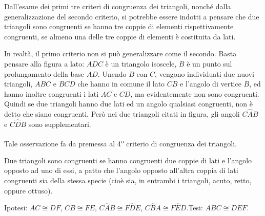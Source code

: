 \osservazione Dall'esame dei primi tre criteri di congruenza dei triangoli, nonché dalla generalizzazione del secondo criterio, si potrebbe essere indotti a pensare che due triangoli sono congruenti se hanno tre coppie di elementi rispettivamente congruenti, se almeno una delle tre coppie di elementi è costituita da lati.

\noindent \begin{minipage}{0.6\textwidth}
In realtà, il primo criterio non si può generalizzare come il secondo. Basta pensare alla figura a lato: $ADC$ è un triangolo isoscele, $B$ è un punto sul prolungamento della base $AD$. Unendo $B$ con $C$, vengono individuati due nuovi triangoli, $ABC$ e $BCD$ che hanno in comune il lato $CB$ e l'angolo di vertice $B$, ed hanno inoltre congruenti i lati $AC$ e $CD$, ma evidentemente non sono congruenti. Quindi se due triangoli hanno due lati ed un angolo qualsiasi congruenti, non è detto che siano congruenti. Però nei due triangoli citati in figura, gli angoli $C\widehat{A}B$ e $C\widehat{D}B$ sono supplementari.
\end{minipage}\hfil
\begin{minipage}{0.4\textwidth}
\centering
\end{minipage}

Tale osservazione fa da premessa al 4\textsuperscript{o} criterio di congruenza dei triangoli.
\begin{teorema}
Due triangoli sono congruenti se hanno congruenti due coppie di lati e l'angolo opposto ad uno di essi, a patto che l'angolo opposto all'altra coppia di lati congruenti sia della stessa specie (cioè sia, in entrambi i triangoli, acuto, retto, oppure ottuso).
\end{teorema}

\noindent Ipotesi: $AC\cong DF$, $CB\cong FE$, $C\widehat{A}B\cong F\widehat{D}E$, $C\widehat{B}A\cong F\widehat{E}D$.\tab Tesi: $ABC\cong DEF$.

